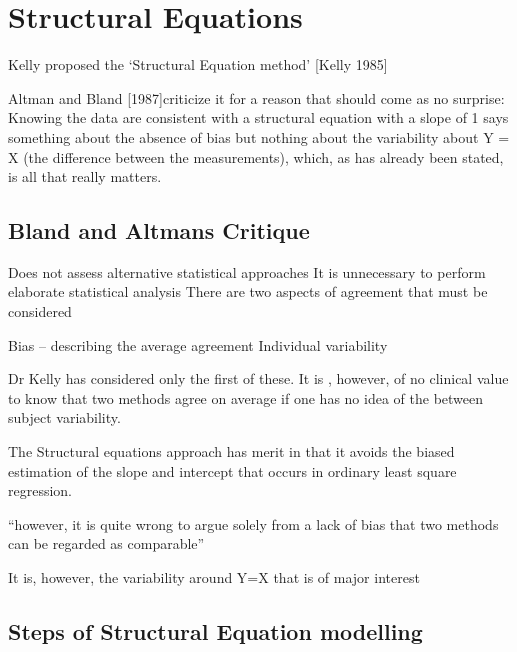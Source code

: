\documentclass[12pt, a4paper]{report}
\theoremstyle{plain}
\theoremstyle{definition}
\theoremstyle{remark}
\begin{document}
\section{Structural Equations}

Kelly proposed the ‘Structural Equation method’ [Kelly 1985]

Altman and Bland [1987]criticize it for a reason that should come as no surprise: 
Knowing the data are consistent with a structural equation with a slope of 1 says something 
about the absence of bias but nothing about the variability about Y = X (the difference between the measurements), which, as has already been stated, is all that really matters.


\subsection{Bland and Altmans Critique}

Does not assess alternative statistical approaches
It is unnecessary to perform elaborate statistical analysis
There are two aspects of agreement that must be considered

Bias – describing the average agreement
Individual variability


Dr Kelly has considered only the first of these.
It is , however, of no clinical value to know that two methods agree on average if one has no idea of the between subject variability.

The Structural equations approach has merit in that it avoids the biased estimation of the slope and intercept that occurs in ordinary least square regression.

“however, it is quite wrong to argue solely from a lack of bias that two methods can be regarded as comparable”

It is, however, the variability around Y=X that is of major interest




\subsection{Steps of Structural Equation modelling}
\end{document}
